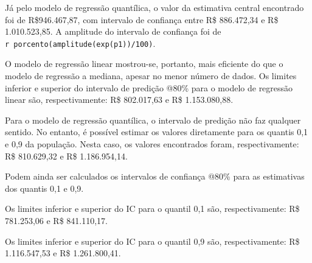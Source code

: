 \documentclass[a4paper, 12pt]{article}
\begin{document}
Já pelo modelo de regressão quantílica, o valor da estimativa central
encontrado foi de R\$946.467,87, com intervalo de confiança entre R\$
886.472,34 e R\$ 1.010.523,85. A amplitude do intervalo de confiança foi
de \texttt{r\ porcento(amplitude(exp(p1))/100)}.

O modelo de regressão linear mostrou-se, portanto, mais eficiente do que
o modelo de regressão a mediana, apesar no menor número de dados. Os
limites inferior e superior do intervalo de predição @80\% para o modelo
de regressão linear são, respectivamente: R\$ 802.017,63 e R\$
1.153.080,88.

Para o modelo de regressão quantílica, o intervalo de predição não faz
qualquer sentido. No entanto, é possível estimar os valores diretamente
para os quantis 0,1 e 0,9 da população. Nesta caso, os valores
encontrados foram, respectivamente: R\$ 810.629,32 e R\$ 1.186.954,14.

Podem ainda ser calculados os intervalos de confiança @80\% para as
estimativas dos quantis 0,1 e 0,9.

Os limites inferior e superior do IC para o quantil 0,1 são,
respectivamente: R\$ 781.253,06 e R\$ 841.110,17.

Os limites inferior e superior do IC para o quantil 0,9 são,
respectivamente: R\$ 1.116.547,53 e R\$ 1.261.800,41.

\printbibliography[title=Referências]
\end{document}
